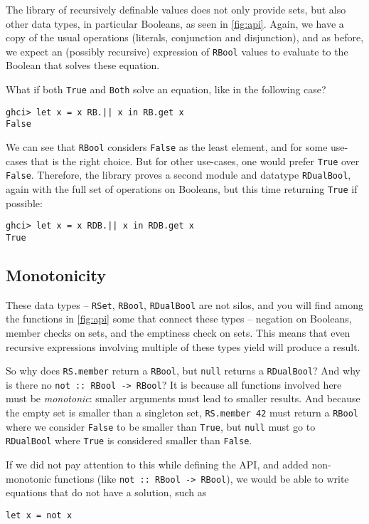 \documentclass[manuscript,screen,acmsmall]{acmart}
\begin{document}
The library of recursively definable values does not only provide sets, but also other data types, in particular Booleans, as seen in \cref{fig:api}. Again, we have a copy of the usual operations (literals, conjunction and disjunction), and as before, we expect an (possibly recursive) expression of \verb|RBool| values to evaluate to the Boolean that solves these equation.

What if both \verb|True| and \verb|Both| solve an equation, like in the following case?
\begin{verbatim}
ghci> let x = x RB.|| x in RB.get x
False
\end{verbatim}
We can see that \verb|RBool| considers \verb|False| as the least element, and for some use-cases that is the right choice. But for other use-cases, one would prefer \verb|True| over \verb|False|. Therefore, the library proves a second module and datatype \verb|RDualBool|, again with the full set of operations on Booleans, but this time returning \verb|True| if possible:
\begin{verbatim}
ghci> let x = x RDB.|| x in RDB.get x
True
\end{verbatim}

\subsection{Monotonicity}\label{sec:monotonicity}

These data types -- \verb|RSet|, \verb|RBool|, \verb|RDualBool| are not silos, and you will find among the functions in \cref{fig:api} some that connect these types -- negation on Booleans, member checks on sets, and the emptiness check on sets.
This means that even recursive expressions involving multiple of these types yield will produce a result.

So why does \verb|RS.member| return a \verb|RBool|, but \verb|null| returns a \verb|RDualBool|? And why is there no \verb|not :: RBool -> RBool|? It is because all functions involved here must be \emph{monotonic}: smaller arguments must lead to smaller results. And because the empty set is smaller than a singleton set, \verb|RS.member 42| must return a \verb|RBool| where we consider \verb|False| to be smaller than \verb|True|, but \verb|null| must go to \verb|RDualBool| where \verb|True| is considered smaller than \verb|False|.

If we did not pay attention to this while defining the API, and added non-monotonic functions (like \verb|not :: RBool -> RBool|), we would be able to write equations that do not have a solution, such as
\begin{verbatim}
let x = not x
\end{verbatim}
\end{document}
